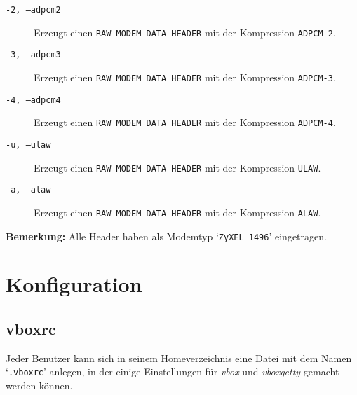 \begin{description}


\item[{\tt -2, --adpcm2}] \mbox{}

Erzeugt einen {\tt RAW MODEM DATA HEADER} mit der Kompression
{\tt ADPCM-2}.



\item[{\tt -3, --adpcm3}] \mbox{}

Erzeugt einen {\tt RAW MODEM DATA HEADER} mit der Kompression
{\tt ADPCM-3}.



\item[{\tt -4, --adpcm4}] \mbox{}

Erzeugt einen {\tt RAW MODEM DATA HEADER} mit der Kompression
{\tt ADPCM-4}.



\item[{\tt -u, --ulaw}] \mbox{}

Erzeugt einen {\tt RAW MODEM DATA HEADER} mit der Kompression
{\tt ULAW}.



\item[{\tt -a, --alaw}] \mbox{}

Erzeugt einen {\tt RAW MODEM DATA HEADER} mit der Kompression
{\tt ALAW}.



\end{description}


{\bf Bemerkung:} Alle Header haben als Modemtyp `{\tt ZyXEL 1496}'
eingetragen.






\section{Konfiguration\label{id-konfiguration}}








\subsection{vboxrc\label{id-vboxrc}}



Jeder Benutzer kann sich in seinem Homeverzeichnis eine Datei mit dem Namen
`{\tt .vboxrc}' anlegen, in der einige Einstellungen f\"{u}r {\em vbox\/} und
{\em vboxgetty\/} gemacht werden k\"{o}nnen.

